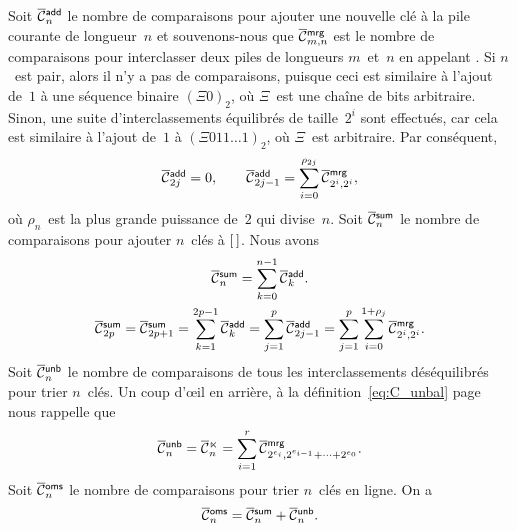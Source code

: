 Soit \(\OC{\fun{add}}{n}\) le nombre de
comparaisons pour ajouter une nouvelle clé à la pile courante de
longueur~\(n\) et souvenons-nous que
\(\OC{\fun{mrg}}{m,n}\) est le nombre
de comparaisons pour interclasser deux piles de longueurs
\(m\)~et~\(n\) en appelant . Si
\(n\)~est pair, alors il n'y a pas de comparaisons, puisque ceci est
similaire à l'ajout de~\(1\) à une séquence binaire \((\Xi{0})_2\), où
\(\Xi\)~est une chaîne de bits arbitraire. Sinon, une suite
d'interclassements équilibrés de taille~\(2^i\) sont effectués, car
cela est similaire à l'ajout de~\(1\) à \((\Xi{011}\ldots 1)_2\), où
\(\Xi\)~est arbitraire. Par conséquent,
\begin{equation*}
\abovedisplayskip=0pt
\belowdisplayskip=0pt
\OC{\fun{add}}{2j} = 0,\qquad
\OC{\fun{add}}{2j-1} = \sum_{i=0}^{\rho_{2j}}{\OC{\fun{mrg}}{2^i,2^i}},
\end{equation*}
où \(\rho_n\)~est la plus grande puissance de~\(2\) qui divise~\(n\).
Soit \(\OC{\fun{sum}}{n}\) le nombre de
comparaisons pour ajouter \(n\)~clés à \([\,]\). Nous avons
\begin{gather}
\abovedisplayskip=0pt
\belowdisplayskip=0pt
\OC{\fun{sum}}{n} = \sum_{k=0}^{n-1}{\OC{\fun{add}}{k}}.\notag\\
\OC{\fun{sum}}{2p} = \OC{\fun{sum}}{2p+1}
= \sum_{k=1}^{2p-1}{\OC{\fun{add}}{k}}
= \sum_{j=1}^{p}{\OC{\fun{add}}{2j-1}}
= \sum_{j=1}^{p}\sum_{i=0}^{1+\rho_{j}}{\OC{\fun{mrg}}{2^i,2^i}}.
\label{eq:sum_2p}
\end{gather}
Soit \(\OC{\fun{unb}}{n}\) le nombre de
comparaisons de tous les interclassements déséquilibrés pour trier
\(n\)~clés. Un coup d'{\oe}il en arrière, à la
définition~\eqref{eq:C_unbal} page~\pageref{eq:C_unbal} nous rappelle
que
\begin{equation}
\OC{\fun{unb}}{n}
= \OC{\ltimes}{n}
= \sum_{i=1}^{r}{\OC{\fun{mrg}}{2^{e_i},2^{e_{i-1}}+\dots+2^{e_0}}}.
\index{unb@$\OC{\fun{unb}}{n}$}
\label{eq:cost_unb}
\end{equation}
Soit \(\OC{\fun{oms}}{n}\) le nombre de
comparaisons pour trier \(n\)~clés en ligne. On a
\begin{equation}
\OC{\fun{oms}}{n} = \OC{\fun{sum}}{n} + \OC{\fun{unb}}{n}.
\index{sum@$\OC{\fun{sum}}{n}$}
\label{eq:ocost_online}
\end{equation}

